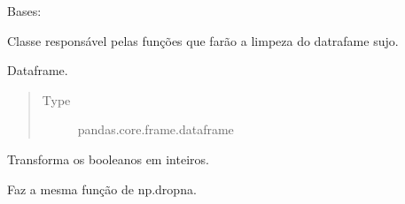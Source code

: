 \documentclass[letterpaper,10pt,brazil]{sphinxmanual}
\begin{document}
\begin{fulllineitems}
\label{\detokenize{classe_RS_limp:classe_RS_limp.RS_limp}}
Bases: 

Classe responsável pelas funções que farão a limpeza do datrafame sujo.

\begin{fulllineitems}
\label{\detokenize{classe_RS_limp:classe_RS_limp.RS_limp.dataframe}}
Dataframe.
\begin{quote}\begin{description}
\item[{Type}] \leavevmode
pandas.core.frame.dataframe

\end{description}\end{quote}

\end{fulllineitems}


\begin{fulllineitems}
\label{\detokenize{classe_RS_limp:classe_RS_limp.RS_limp.trocar_bools_para_int}}
Transforma os booleanos em inteiros.

\end{fulllineitems}


\begin{fulllineitems}
\label{\detokenize{classe_RS_limp:classe_RS_limp.RS_limp.drop_na}}
Faz a mesma função de np.dropna.

\end{fulllineitems}



\end{fulllineitems}
\end{document}
